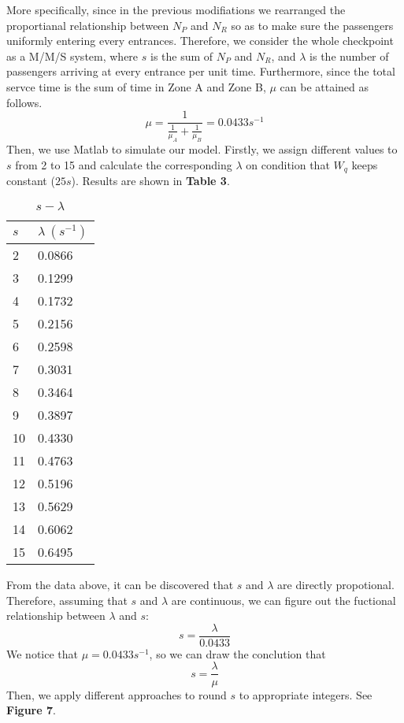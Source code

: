 \documentclass{mcmthesis}
\begin{document}
	More specifically, since in the previous modifiations we rearranged the proportianal relationship between $N_P$ and $N_R$ so as to make sure the passengers uniformly entering every entrances. Therefore, we consider the whole checkpoint as a M/M/S system, where $s$ is the sum of $N_P$ and $N_R$, and $\lambda$ is the number of passengers  arriving at every entrance per unit time. Furthermore, since the total servce time is the sum of time in Zone A and Zone B, $\mu$ can be attained as follows.
	$$\mu=\frac{1}{\frac{1}{\mu_A}+\frac{1}{\mu_B}}=0.0433s^{-1}$$
	Then, we use Matlab to simulate our model. Firstly, we assign different values to $s$ from 2 to 15 and calculate the corresponding $\lambda$ on condition that $W_q$ keeps constant ($25s$). Results are shown in \textbf{Table 3}.
	
	\begin{table}[htbp]
		\centering
		\begin{tabular}{m{4cm}<{\centering}m{4cm}<{\centering}}
			\toprule
			\textbf{$s$}&\textbf{$\lambda\ (s^{-1})$}\\
			\midrule
			2&0.0866\\
			
			3&0.1299\\
			
			4&0.1732\\
			
			5&0.2156\\
			
			6&0.2598\\
			
			7&0.3031\\
			
			8&0.3464\\
			
			9&0.3897\\
			
			10&0.4330\\ 
			
			11&0.4763\\ 
			
			12&0.5196\\
			
			13&0.5629\\
			
			14&0.6062\\
			
			15&0.6495\\
			\bottomrule
		\end{tabular}
		\caption{$s-\lambda$}\label{tab:Data}
	\end{table}
	From the data above, it can be discovered that $s$ and $\lambda$ are directly propotional. Therefore, assuming that $s$ and $\lambda$ are continuous, we can figure out the fuctional relationship between $\lambda$ and $s$:
	$$s=\frac{\lambda}{0.0433}$$
	We notice that $\mu=0.0433s^{-1}$, so we can draw the conclution that
	$$s=\frac{\lambda}{\mu}$$
	Then, we apply different approaches to round $s$ to appropriate integers. See \textbf{Figure 7}.
	
\end{document}
